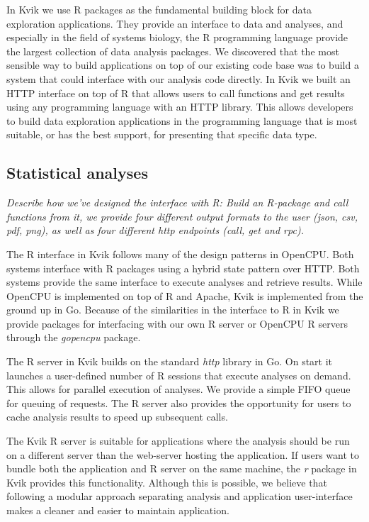 In Kvik we use R packages as the fundamental building block for data exploration
applications. They provide an interface to data and analyses, and especially in
the field of systems biology, the R programming language provide the largest
collection of data analysis packages. %
We discovered that the most sensible way to build applications on top of our
existing code base was to build a system that could interface with our analysis
code directly. In Kvik we built an HTTP interface on top of R that allows users
to call functions and get results using any programming language with an HTTP
library. This allows developers to build data exploration applications in the
programming language that is most suitable, or has the best support, for
presenting that specific data type. 

\subsection*{Statistical analyses}
\emph{Describe how we've designed the interface with R: Build an R-package and
call functions from it, we provide four different output formats to the user
(json, csv, pdf, png),  as well as four different http endpoints (call, get and
rpc).}

The R interface in Kvik follows many of the design patterns in OpenCPU. Both
systems interface with R packages using a hybrid state pattern over HTTP. Both
systems provide the same interface to execute analyses and retrieve results.
While OpenCPU is implemented on top of R and Apache, Kvik is implemented from
the ground up in Go. Because of the similarities in the interface to R in Kvik
we provide packages for interfacing with our own R server or OpenCPU R servers
through the \emph{gopencpu} package. 

The R server in Kvik builds on the standard \emph{http} library in Go. On start
it launches a user-defined number of R sessions that execute analyses on demand.
This allows for parallel execution of analyses. We provide a simple FIFO queue
for queuing of requests. The R server also provides the opportunity for users to
cache analysis results to speed up subsequent calls. 

The Kvik R server is suitable for applications where the analysis should be run
on a different server than the web-server hosting the application. If users want
to bundle both the application and R server on the same machine, the \emph{r}
package in Kvik provides this functionality. Although this is possible, we
believe that following a modular approach separating analysis and
application user-interface makes a cleaner and easier to maintain application. 

